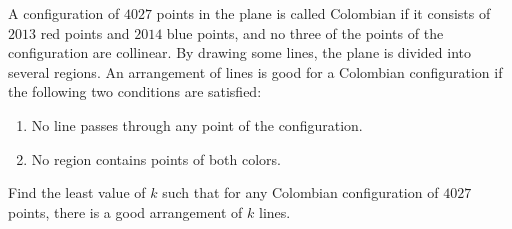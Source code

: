 A configuration of $4027$ points in the plane is called Colombian if it consists of $2013$ red points and $2014$
 blue points, and no three of the points of the configuration are 
collinear. By drawing some lines, the plane is divided into several 
regions. An arrangement of lines is good for a Colombian configuration 
if the following two conditions are satisfied:

\begin{enumerate}[label = (\roman*)]
	\item No line passes through any point of the configuration.
	\item No region contains points of both colors.
\end{enumerate}

Find the least value of $k$ such that for any Colombian configuration of $4027$ points, there is a good arrangement of $k$ lines.
